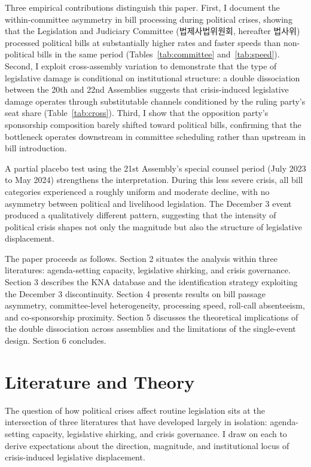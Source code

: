 \documentclass[11pt]{article}
\begin{document}
Three empirical contributions distinguish this paper. First, I document the within-committee asymmetry in bill processing during political crises, showing that the Legislation and Judiciary Committee (법제사법위원회, hereafter 법사위) processed political bills at substantially higher rates and faster speeds than non-political bills in the same period (Tables~\ref{tab:committee} and~\ref{tab:speed}). Second, I exploit cross-assembly variation to demonstrate that the type of legislative damage is conditional on institutional structure: a double dissociation between the 20th and 22nd Assemblies suggests that crisis-induced legislative damage operates through substitutable channels conditioned by the ruling party's seat share (Table~\ref{tab:cross}). Third, I show that the opposition party's sponsorship composition barely shifted toward political bills, confirming that the bottleneck operates downstream in committee scheduling rather than upstream in bill introduction.

A partial placebo test using the 21st Assembly's special counsel period (July 2023 to May 2024) strengthens the interpretation. During this less severe crisis, all bill categories experienced a roughly uniform and moderate decline, with no asymmetry between political and livelihood legislation. The December 3 event produced a qualitatively different pattern, suggesting that the intensity of political crisis shapes not only the magnitude but also the structure of legislative displacement.

The paper proceeds as follows. Section 2 situates the analysis within three literatures: agenda-setting capacity, legislative shirking, and crisis governance. Section 3 describes the KNA database and the identification strategy exploiting the December 3 discontinuity. Section 4 presents results on bill passage asymmetry, committee-level heterogeneity, processing speed, roll-call absenteeism, and co-sponsorship proximity. Section 5 discusses the theoretical implications of the double dissociation across assemblies and the limitations of the single-event design. Section 6 concludes.

\section{Literature and Theory}

The question of how political crises affect routine legislation sits at the intersection of three literatures that have developed largely in isolation: agenda-setting capacity, legislative shirking, and crisis governance. I draw on each to derive expectations about the direction, magnitude, and institutional locus of crisis-induced legislative displacement.
\end{document}
